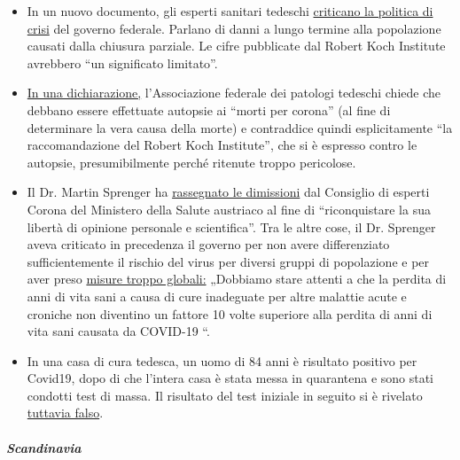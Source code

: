 \begin{itemize}
\tightlist
\item
  In un nuovo documento, gli esperti sanitari tedeschi
  \href{https://www.tagesschau.de/investigativ/ndr-wdr/corona-experten-thesenpapier-101.html}{criticano
  la politica di crisi} del governo federale. Parlano di danni a lungo
  termine alla popolazione causati dalla chiusura parziale. Le cifre
  pubblicate dal Robert Koch Institute avrebbero ``un significato
  limitato''.
\item
  \href{https://www.pathologie-dgp.de/die-dgp/aktuelles/meldung/pressemitteilung-an-corona-verstorbene-sollten-obduziert-werden/}{In
  una dichiarazione,} l'Associazione federale dei patologi tedeschi
  chiede che debbano essere effettuate autopsie ai ``morti per corona''
  (al fine di determinare la vera causa della morte) e contraddice
  quindi esplicitamente ``la raccomandazione del Robert Koch
  Institute'', che si è espresso contro le autopsie, presumibilmente
  perché ritenute troppo pericolose.
\item
  Il Dr. Martin Sprenger ha
  \href{https://mailchi.mp/addendum/fles-home-office-260342}{rassegnato
  le dimissioni} dal Consiglio di esperti Corona del Ministero della
  Salute austriaco al fine di ``riconquistare la sua libertà di opinione
  personale e scientifica''. Tra le altre cose, il Dr. Sprenger aveva
  criticato in precedenza il governo per non avere differenziato
  sufficientemente il rischio del virus per diversi gruppi di
  popolazione e per aver preso
  \href{https://www.addendum.org/coronavirus/interview-sprenger/}{misure
  troppo globali:} „Dobbiamo stare attenti a che la perdita di anni di
  vita sani a causa di cure inadeguate per altre malattie acute e
  croniche non diventino un fattore 10 volte superiore alla perdita di
  anni di vita sani causata da COVID-19 ``.
\item
  In una casa di cura tedesca, un uomo di 84 anni è risultato positivo
  per Covid19, dopo di che l'intera casa è stata messa in quarantena e
  sono stati condotti test di massa. Il risultato del test iniziale in
  seguito si è rivelato
  \href{https://www.schwerin.de/news/4a3e5560-78c9-11ea-b543-1967de695b51/}{tuttavia
  falso}.
\end{itemize}

\hypertarget{scandinavia}{%
\subparagraph{\texorpdfstring{\textbf{Scandinavia}}{Scandinavia}}\label{scandinavia}}

